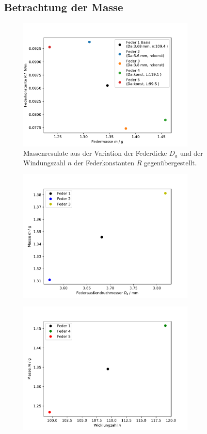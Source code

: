 \subsection{Betrachtung der Masse}
\begin{figure}[H]
  \center
  \includegraphics[width=0.8\textwidth]{plots/masse_konstante_dia.pdf}
  \caption{Massenresulate aus der Variation der Federdicke $D_a$
          und der Windungszahl $n$ der Federkonstanten $R$ gegenübergestellt. }
\end{figure}
\begin{figure}[H]
  \center
  \includegraphics[width=0.8\textwidth]{plots/m_D_dia.pdf}
  \caption{}
\end{figure}
\begin{figure}[H]
  \center
  \includegraphics[width=0.8\textwidth]{plots/m_n_dia.pdf}
  \caption{}
\end{figure}

\label{sec:Auswertung}
